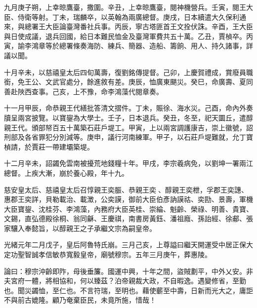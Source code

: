 \begin{pinyinscope}
九月庚子朔，上幸晾鷹臺，撒圍。辛丑，上幸晾鷹臺，閱神機營兵。壬寅，閱王大臣、侍衛等射。丁未，瑞麟卒，以英翰為兩廣總督。庚戌，日本續遣大久保利通來，與總署王大臣論臺灣番社兵事。丙辰，寧古塔匪首王文拴伏誅。辛酉，王大臣與日使成議，退兵回國，給日本難民恤金及臺灣軍費共五十萬。乙丑，賈楨卒。丙寅，諭李鴻章等於總署條奏海防、練兵、簡器、造船、籌餉、用人、持久諸事，詳議以聞。

十月辛未，以慈禧皇太后四旬萬壽，復劉銘傳提督。己卯，上慶賀禮成，賞廢員職銜，免王公、文武官處分，餘進敘有差。庚辰，恤廣東颶災。癸巳，命廣壽、夏同善赴陜西查事。己亥，上不豫，命李鴻藻代閱章奏。

十一月甲辰，命恭親王代繕批答清文摺件。丁未，賑徐、海水災。己酉，命內外奏牘呈兩宮披覽。以寶鋆為大學士。壬子，日本退兵。癸丑，冬至，祀天圜丘，遣醇親王代。頒部帑百五十萬築石莊戶堤工。甲寅，上以兩宮調護康吉，崇上徽號，詔刑部及各省罪犯分別減等。庚申，議行河南練軍。甲子，以石莊戶堤難就，允丁寶楨請，於賈莊一帶建壩築堤。

十二月辛未，詔蠲免雲南被擾荒地錢糧十年。甲戌，李宗羲病免，以劉坤一署兩江總督。上疾大漸，崩於養心殿，年十九。

慈安皇太后、慈禧皇太后召惇親王奕脤、恭親王奕、醇親王奕枻，孚郡王奕譓、惠郡王奕詳，貝勒載治、載澂，公奕謨，御前大臣伯彥訥謨祜、奕劻、景壽，軍機大臣寶鋆、沈桂芬、李鴻藻，內務府大臣英桂、崇綸、魁齡、榮祿、明善、貴寶、文錫，直弘德殿徐桐、翁同龢、王慶祺，南書房黃鈺、潘祖廕、孫詒經、徐郙、張家驤入奉懿旨，以醇親王之子承繼文宗為嗣皇帝。

光緒元年二月戊子，皇后阿魯特氏崩。三月己亥，上尊謚曰繼天開運受中居正保大定功聖智誠孝信敏恭寬毅皇帝，廟號穆宗。五年三月庚午，葬惠陵。

論曰：穆宗沖齡即阼，母後垂簾。國運中興，十年之間，盜賊劃平，中外乂安。非夫宮府一體，將相協和，何以臻茲？泊帝親裁大政，不自暇逸。遇變修省，至勤也。聞災蠲恤，至仁也。不言符瑞，至明也。藉使蘄至中壽，日新而光大之，庸詎不與前古媲隆。顧乃奄棄臣民，未竟所施，惜哉！


\end{pinyinscope}